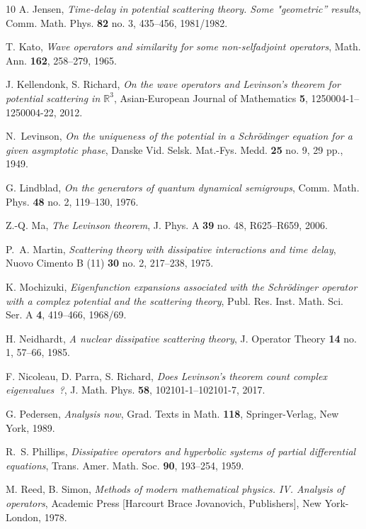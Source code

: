 \documentclass{article}
\def\R{\mathbb R}
\begin{document}
\begin{thebibliography}{10}
A. Jensen,
\emph{Time-delay in potential scattering theory. Some "geometric'' results},
Comm. Math. Phys. {\bf 82} no. 3, 435--456, 1981/1982.

T. Kato, 
\emph{Wave operators and similarity for some non-selfadjoint operators}, 
Math. Ann. {\bf 162}, 258--279, 1965.

J. Kellendonk, S. Richard,
\emph{On the wave operators and Levinson's theorem for potential scattering in $\R^3$},
Asian-European Journal of Mathematics {\bf 5}, 1250004-1--1250004-22, 2012.

N.~Levinson, 
\emph{On the uniqueness of the potential in a Schr\"odinger equation for a given
asymptotic phase}, Danske Vid. Selsk. Mat.-Fys. Medd. {\bf 25} no. 9, 29 pp., 1949.

G. Lindblad, 
\emph{On the generators of quantum dynamical semigroups}, 
Comm. Math. Phys. {\bf 48} no. 2, 119--130, 1976.

Z.-Q. Ma, 
\emph{The Levinson theorem}, 
J. Phys. A {\bf 39} no. 48, R625–R659, 2006.

P.~A. Martin,
\emph{Scattering theory with dissipative interactions and time delay},
Nuovo Cimento B (11) {\bf 30} no. 2, 217--238, 1975.

K. Mochizuki,
\emph{Eigenfunction expansions associated with the {S}chr\"odinger operator
with a complex potential and the scattering theory},
Publ. Res. Inst. Math. Sci. Ser. A {\bf 4}, 419--466, 1968/69.

H. Neidhardt,
\emph{A nuclear dissipative scattering theory},
J. Operator Theory {\bf 14} no. 1, 57--66, 1985.

F. Nicoleau, D. Parra, S. Richard, 
\emph{Does Levinson's theorem count complex eigenvalues~?},
J. Math. Phys. {\bf 58}, 102101-1--102101-7, 2017. 

G. Pedersen, 
\emph{Analysis now}, Grad. Texts in Math. {\bf 118},
Springer-Verlag, New York, 1989.

R.~S. Phillips,
\emph{Dissipative operators and hyperbolic systems of partial differential equations},
Trans. Amer. Math. Soc. {\bf 90}, 193--254, 1959.

M. Reed, B. Simon,
\emph{Methods of modern mathematical physics. IV. Analysis of operators},
Academic Press [Harcourt Brace Jovanovich, Publishers], New York-London, 1978.


\end{thebibliography}
\end{document}
